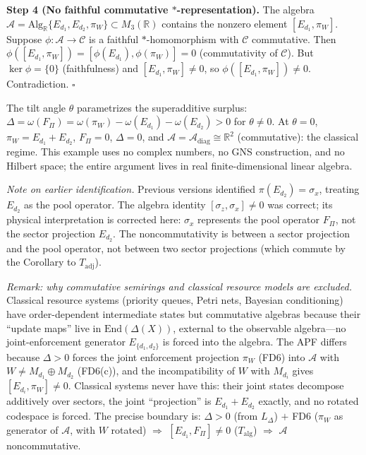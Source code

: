 \documentclass[11pt]{article}
\theoremstyle{remark}
\begin{document}
\smallskip\noindent\textbf{Step 4 (No faithful commutative $*$-representation).}  The algebra $\mathcal{A} = \mathrm{Alg}_\mathbb{R}\{E_{d_1}, E_{d_2}, \pi_W\} \subset M_3(\mathbb{R})$ contains the nonzero element $[E_{d_1}, \pi_W]$.  Suppose $\phi: \mathcal{A} \to \mathcal{C}$ is a faithful $*$-homomorphism with $\mathcal{C}$ commutative.  Then $\phi([E_{d_1}, \pi_W]) = [\phi(E_{d_1}), \phi(\pi_W)] = 0$ (commutativity of $\mathcal{C}$).  But $\ker\phi = \{0\}$ (faithfulness) and $[E_{d_1}, \pi_W] \ne 0$, so $\phi([E_{d_1}, \pi_W]) \ne 0$.  Contradiction.  $\square$

\smallskip\noindent The tilt angle $\theta$ parametrizes the superadditive surplus: $\Delta = \omega(F_\Pi) = \omega(\pi_W) - \omega(E_{d_1}) - \omega(E_{d_2}) > 0$ for $\theta \ne 0$.  At $\theta = 0$, $\pi_W = E_{d_1} + E_{d_2}$, $F_\Pi = 0$, $\Delta = 0$, and $\mathcal{A} = \mathcal{A}_{\mathrm{diag}} \cong \mathbb{R}^2$ (commutative): the classical regime.  This example uses no complex numbers, no GNS construction, and no Hilbert space; the entire argument lives in real finite-dimensional linear algebra.

\smallskip\noindent\textit{Note on earlier identification.}  Previous versions identified $\pi(E_{d_2}) = \sigma_x$, treating $E_{d_2}$ as the pool operator.  The algebra identity $[\sigma_z, \sigma_x] \ne 0$ was correct; its physical interpretation is corrected here: $\sigma_x$ represents the pool operator $F_\Pi$, not the sector projection $E_{d_2}$.  The noncommutativity is between a sector projection and the pool operator, not between two sector projections (which commute by the Corollary to $T_{\mathrm{adj}}$).

\smallskip\noindent\textit{Remark: why commutative semirings and classical resource models are excluded.}
Classical resource systems (priority queues, Petri nets, Bayesian conditioning) have order-dependent intermediate states but commutative algebras because their ``update maps'' live in $\mathrm{End}(\Delta(X))$, external to the observable algebra---no joint-enforcement generator $E_{\{d_1,d_2\}}$ is forced into the algebra.  The APF differs because $\Delta > 0$ forces the joint enforcement projection $\pi_W$ (FD6) into $\mathcal{A}$ with $W \ne M_{d_1} \oplus M_{d_2}$ (FD6(c)), and the incompatibility of $W$ with $M_{d_i}$ gives $[E_{d_i}, \pi_W] \ne 0$.  Classical systems never have this: their joint states decompose additively over sectors, the joint ``projection'' is $E_{d_1} + E_{d_2}$ exactly, and no rotated codespace is forced.  The precise boundary is: $\Delta > 0$ (from $L_\Delta$) $+$ FD6 ($\pi_W$ as generator of $\mathcal{A}$, with $W$ rotated) $\Rightarrow$ $[E_{d_1}, F_\Pi] \ne 0$ ($T_{\mathrm{alg}}$) $\Rightarrow$ $\mathcal{A}$ noncommutative.
\end{document}
